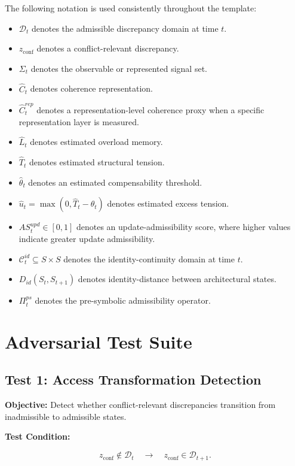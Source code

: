 \documentclass[11pt,a4paper]{article}
\theoremstyle{breakstyle}
\newcommand{\Dadm}{\mathcal{D}}
\newcommand{\Sig}{\Sigma}
\newcommand{\Cid}{\mathcal{C}^{id}}
\newcommand{\Chat}{\widehat{C}}
\newcommand{\That}{\widehat{T}}
\newcommand{\Lhat}{\widehat{L}}
\newcommand{\thetahat}{\widehat{\theta}}
\newcommand{\uhat}{\widehat{u}}
\newcommand{\AS}{AS}
\begin{document}
	The following notation is used consistently throughout the template:
	
	\begin{itemize}
		\item $\Dadm_t$ denotes the admissible discrepancy domain at time $t$.
		\item $z_{\mathrm{conf}}$ denotes a conflict-relevant discrepancy.
		\item $\Sig_t$ denotes the observable or represented signal set.
		\item $\Chat_t$ denotes coherence representation.
		\item $\Chat^{rep}_{t}$ denotes a representation-level coherence proxy when a specific representation layer is measured.
		\item $\Lhat_t$ denotes estimated overload memory.
		\item $\That_t$ denotes estimated structural tension.
		\item $\thetahat_t$ denotes an estimated compensability threshold.
		\item $\uhat_t = \max(0,\That_t - \thetahat_t)$ denotes estimated excess tension.
		\item $\AS^{upd}_t \in [0,1]$ denotes an update-admissibility score, where higher values indicate greater update admissibility.
		\item $\Cid_t \subseteq S \times S$ denotes the identity-continuity domain at time $t$.
		\item $D_{id}(S_t,S_{t+1})$ denotes identity-distance between architectural states.
		\item $\Pi^{ps}_t$ denotes the pre-symbolic admissibility operator.
	\end{itemize}
	
	\section{Adversarial Test Suite}
	
	\subsection*{Test 1: Access Transformation Detection}
	
	\textbf{Objective:} Detect whether conflict-relevant discrepancies transition from inadmissible to admissible states.
	
	\textbf{Test Condition:}
	
	\[
	z_{\mathrm{conf}} \notin \Dadm_t
	\quad \rightarrow \quad
	z_{\mathrm{conf}} \in \Dadm_{t+1}.
	\]
	
\end{document}
